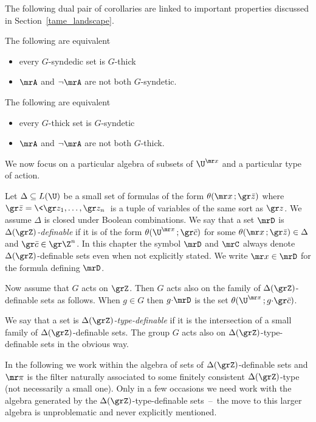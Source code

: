 The following dual pair of corollaries are linked to important properties discussed in Section~\ref{tame_landscape}.

\begin{corollary}
  The following are equivalent
  \begin{itemize}
    \item [1.] every $G$-syndedic set is $G$-thick
    \item [2.] $\mrA$ and $\neg\mrA$ are not both $G$-syndetic.
  \end{itemize}
\end{corollary}

\begin{corollary}
  The following are equivalent
  \begin{itemize}
    \item [1.] every $G$-thick set is $G$-syndetic
    \item [2.] $\mrA$ and $\neg\mrA$ are not both $G$-thick.
  \end{itemize}
\end{corollary}

We now focus on a particular algebra of subsets of $\U^{\mr x}$ and a particular type of action.

Let $\Delta\subseteq L(\U)$ be a small set of formulas of the form $\theta({\mr x}\,;{\gr\bar z})$ where ${\gr\bar z}=\<{\gr z_1},\dots,{\gr z_n}\>$ is a tuple of variables of the same sort as ${\gr z}$.
We assume $\Delta$ is closed under Boolean combinations.
We say that a set $\mrD$ is \emph{$\Delta(\grZ)$-definable\/} if it is of the form $\theta(\U^{\mr x}\,;{\gr\bar c})$ for some $\theta({\mr x}\,;{\gr\bar z})\in\Delta$ and ${\gr\bar c}\in{\gr\Z^n}$.
In this chapter the symbol $\mrD$ and $\mrC$ always denote $\Delta(\grZ)$-definable sets even when not explicitly stated.
We write ${\mr x}\in\mrD$ for the formula defining $\mrD$.

Now assume that $G$ acts on $\grZ$.
Then $G$ acts also on the family of $\Delta(\grZ)$-definable sets as follows.
When $g\in G$ then $g{\cdot}\mrD$ is the set $\theta(\U^{\mr x}\,;g{\cdot}{\gr\bar c})$.

We say that a set is \emph{$\Delta(\grZ)$-type-definable\/} if it is the intersection of a small family of $\Delta(\grZ)$-definable sets.
The group $G$ acts also on $\Delta(\grZ)$-type-definable sets in the obvious way.

In the following we work within the algebra of sets of $\Delta(\grZ)$-definable sets and ${\mr\pi}$ is the filter naturally associated to some finitely consistent $\Delta(\grZ)$-type (not necessarily a small one).
Only in a few occasions we need work with the algebra generated by the $\Delta(\grZ)$-type-definable sets~--~the move to this larger algebra is unproblematic and never explicitly mentioned.

